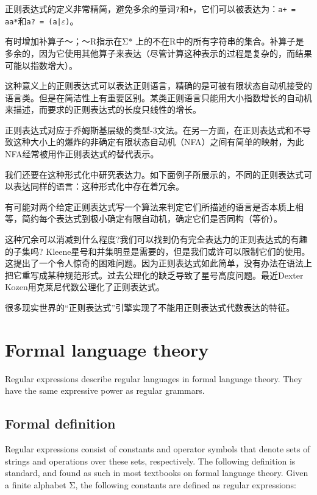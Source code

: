 正则表达式的定义非常精简，避免多余的量词\texttt{?}和\texttt{+}，它们可以被表达为：\texttt{a+ = aa*}和\texttt{a? = (a|$\varepsilon$)}。

有时增加补算子～；～R指示在Σ* 上的不在R中的所有字符串的集合。补算子是多余的，因为它使用其他算子来表达（尽管计算这种表示的过程是复杂的，而结果可能以指数增大）。

这种意义上的正则表达式可以表达正则语言，精确的是可被有限状态自动机接受的语言类。但是在简洁性上有重要区别。某类正则语言只能用大小指数增长的自动机来描述，而要求的正则表达式的长度只线性的增长。

正则表达式对应于乔姆斯基层级的类型-3文法。在另一方面，在正则表达式和不导致这种大小上的爆炸的非确定有限状态自动机（NFA）之间有简单的映射，为此NFA经常被用作正则表达式的替代表示。

我们还要在这种形式化中研究表达力。如下面例子所展示的，不同的正则表达式可以表达同样的语言：这种形式化中存在着冗余。

有可能对两个给定正则表达式写一个算法来判定它们所描述的语言是否本质上相等，简约每个表达式到极小确定有限自动机，确定它们是否同构（等价）。

这种冗余可以消减到什么程度?我们可以找到仍有完全表达力的正则表达式的有趣的子集吗? Kleene星号和并集明显是需要的，但是我们或许可以限制它们的使用。这提出了一个令人惊奇的困难问题。因为正则表达式如此简单，没有办法在语法上把它重写成某种规范形式。过去公理化的缺乏导致了星号高度问题。最近Dexter Kozen用克莱尼代数公理化了正则表达式。

很多现实世界的“正则表达式”引擎实现了不能用正则表达式代数表达的特征。

\chapter{Formal language theory}

Regular expressions describe regular languages in formal language theory. They have the same expressive power as regular grammars.






\section{Formal definition}

Regular expressions consist of constants and operator symbols that denote sets of strings and operations over these sets, respectively. The following definition is standard, and found as such in most textbooks on formal language theory. Given a finite alphabet Σ, the following constants are defined as regular expressions:


